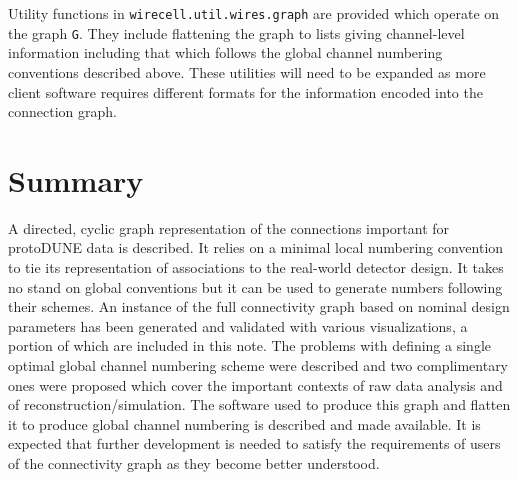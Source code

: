 \documentclass[pdftex,12pt,letter]{article}
\begin{document}
Utility functions in \texttt{wirecell.util.wires.graph} are provided
which operate on the graph \texttt{G}.  They include flattening the
graph to lists giving channel-level information including that which
follows the global channel numbering conventions described above.
These utilities will need to be expanded as more client software
requires different formats for the information encoded into the
connection graph.

\section{Summary}

A directed, cyclic graph representation of the connections important
for protoDUNE data is described.  It relies on a minimal local
numbering convention to tie its representation of associations to the
real-world detector design.  It takes no stand on global conventions
but it can be used to generate numbers following their schemes.  An
instance of the full connectivity graph based on nominal design
parameters has been generated and validated with various
visualizations, a portion of which are included in this note.  The
problems with defining a single optimal global channel numbering
scheme were described and two complimentary ones were proposed which
cover the important contexts of raw data analysis and of
reconstruction/simulation.  The software used to produce this graph
and flatten it to produce global channel numbering is described and
made available.  It is expected that further development is needed to
satisfy the requirements of users of the connectivity graph as they
become better understood.
\end{document}
